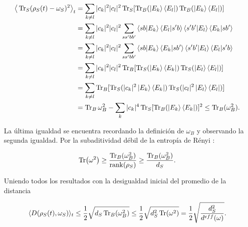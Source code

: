 \begin{align*}
\big \langle \Tr_{S}(\rho_{S}(t)-\omega_{S})^{2} \big \rangle_{t} &= \sum_{k \neq l} |c_{k}|^{2} |c_{l}|^{2} \Tr_{S} [\Tr_{B}(\ket{E_{k}} \bra{E_{l}}) \Tr_{B}(\ket{E_{k}} \bra{E_{l}})]\\
	&=\sum_{k \neq l} |c_{k}|^{2} |c_{l}|^{2} \sum_{ss' bb'} \bra{sb}\ket{E_{k}} \bra{E_{l}}\ket{s'b} \bra{s'b'}\ket{E_{l}} \bra{E_{k}}\ket{sb'}\\
	&=\sum_{k \neq l} |c_{k}|^{2} |c_{l}|^{2} \sum_{ss' bb'} \bra{sb}\ket{E_{k}} \bra{E_{k}}\ket{sb'} \bra{s'b'}\ket{E_{l}} \bra{E_{l}}\ket{s'b}\\
	&=\sum_{k \neq l} |c_{k}|^{2} |c_{l}|^{2} \Tr_{B} [\Tr_{S}(\ket{E_{k}} \bra{E_{k}}) \Tr_{S}(\ket{E_{l}} \bra{E_{l}})]\\
	&=\sum_{k \neq l}  \Tr_{B} [\Tr_{S}(|c_{k}|^{2}\ket{E_{k}} \bra{E_{k}}) \Tr_{S}( |c_{l}|^{2} \ket{E_{l}} \bra{E_{l}})]\\
&=\Tr_{B} \omega_{B}^{2} -\sum_{k} |c_{k}|^{4} \Tr_{S}[ \Tr_{B}( \ket{E_{k}} \bra{E_{k}})]^{2} \leq  \Tr_{B}( \omega_{B}^{2}).
\end{align*}

La última  igualdad se encuentra recordando la definición de $\omega_{B}$ y observando la segunda igualdad. Por la subaditividad débil de la entropía de Rényi \cite{RenyiEntropia}:

\begin{equation}
\Tr(\omega^{2}) \geq  \frac{\Tr_{B}(\omega_{B}^{2})}{ \rank (\rho_{S})} \geq \frac{\Tr_{B}(\omega_{B}^{2})}{d_{S}}.
\end{equation}

Uniendo todos los resultados con la desigualdad inicial del promedio de la distancia

\begin{equation}
\langle D(\rho_{S}(t) ,\omega_{S}) \rangle_{t} \le  \frac{1}{2} \sqrt{d_{S} \Tr_{B}(\omega_{B}^{2})} \le \frac{1}{2}\sqrt{d_{S}^{2} 	\Tr(\omega^{2})}=\frac{1}{2}\sqrt{\frac{d_{S}^{2}}{d^{eff}(\omega)}}.
\end{equation}

